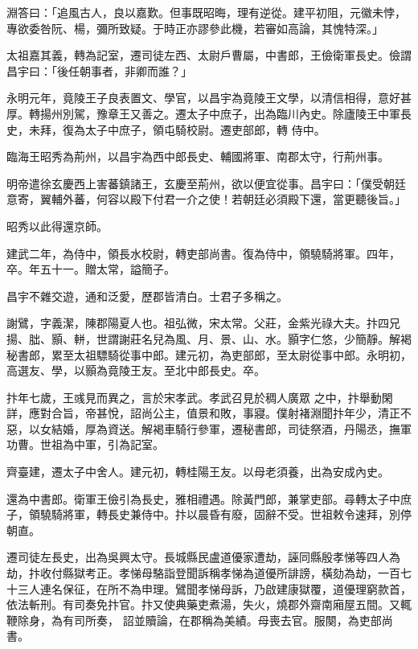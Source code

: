 \begin{pinyinscope}
 淵答曰：「追風古人，良以嘉歎。但事既昭晦，理有逆從。建平初阻，元徽未悖，專欲委咎阮、楊，彌所致疑。于時正亦謬參此機，若審如高論，其愧特深。」



 太祖嘉其義，轉為記室，遷司徒左西、太尉戶曹屬，中書郎，王儉衛軍長史。儉謂昌宇曰：「後任朝事者，非卿而誰？」



 永明元年，竟陵王子良表置文、學官，以昌宇為竟陵王文學，以清信相得，意好甚厚。轉揚州別駕，豫章王又善之。遷太子中庶子，出為臨川內史。除廬陵王中軍長史，未拜，復為太子中庶子，領屯騎校尉。遷吏部郎，轉
 侍中。



 臨海王昭秀為荊州，以昌宇為西中郎長史、輔國將軍、南郡太守，行荊州事。



 明帝遣徐玄慶西上害蕃鎮諸王，玄慶至荊州，欲以便宜從事。昌宇曰：「僕受朝廷意寄，翼輔外蕃，何容以殿下付君一介之使！若朝廷必須殿下還，當更聽後旨。」



 昭秀以此得還京師。



 建武二年，為侍中，領長水校尉，轉吏部尚書。復為侍中，領驍騎將軍。四年，卒。年五十一。贈太常，謚簡子。



 昌宇不雜交遊，通和泛愛，歷郡皆清白。士君子多稱之。



 謝鷿，字義潔，陳郡陽夏人也。祖弘微，宋太常。父莊，金紫光祿大夫。抃四兄揚、朏、顥、軿，世謂謝莊名兒為風、月、景、山、水。顥字仁悠，少簡靜。解褐秘書郎，累至太祖驃騎從事中郎。建元初，為吏部郎，至太尉從事中郎。永明初，高選友、學，以顥為竟陵王友。至北中郎長史。卒。



 抃年七歲，王彧見而異之，言於宋孝武。孝武召見於稠人廣眾
 之中，抃舉動閑詳，應對合旨，帝甚悅，詔尚公主，值景和敗，事寢。僕射褚淵聞抃年少，清正不惡，以女結婚，厚為資送。解褐車騎行參軍，遷秘書郎，司徒祭酒，丹陽丞，撫軍功曹。世祖為中軍，引為記室。



 齊臺建，遷太子中舍人。建元初，轉桂陽王友。以母老須養，出為安成內史。



 還為中書郎。衛軍王儉引為長史，雅相禮遇。除黃門郎，兼掌吏部。尋轉太子中庶子，領驍騎將軍，轉長史兼侍中。抃以晨昏有廢，固辭不受。世祖敕令速拜，別停朝直。



 遷司徒左長史，出為吳興太守。長城縣民盧道優家遭劫，誣同縣殷孝悌等四人為劫，抃收付縣獄考正。孝悌母駱詣登聞訴稱孝悌為道優所誹謗，橫劾為劫，一百七十三人連名保征，在所不為申理。鷿聞孝悌母訴，乃啟建康獄覆，道優理窮款首，依法斬刑。有司奏免抃官。抃又使典藥吏煮湯，失火，燒郡外齋南廂屋五間。又輒鞭除身，為有司所奏，
 詔並贖論，在郡稱為美績。母喪去官。服闋，為吏部尚書。




\end{pinyinscope}
